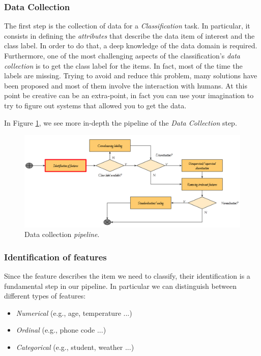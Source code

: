 \subsubsection{Data Collection}

The first step is the collection of data for a \emph{Classification} task. In particular, it consists in defining the \emph{attributes} that describe the data item of interest and the class label. In order to do that, a deep knowledge of the data domain is required. Furthermore, one of the most challenging aspects of the classification's \emph{data collection} is to get the class label for the items. In fact, most of the time the labels are missing. Trying to avoid and reduce this problem, many solutions have been proposed and most of them involve the interaction with humans. At this point be creative can be an extra-point, in fact you can use your imagination to try to figure out systems that allowed you to get the data.

In Figure \ref{pic:data_collection_pipeline}, we see more in-depth the pipeline of the \emph{Data Collection} step. 

\begin{figure}[H]%
 \centering
 \includegraphics[width=13cm]{./img/08/data_collection_pipeline}
 \caption{\label{pic:data_collection_pipeline} Data collection \emph{pipeline}.}
\end{figure}

\subsubsection*{Identification of features}

Since the feature describes the item we need to classify, their identification is a fundamental step in our pipeline. In particular we can distinguish between different types of features:
\begin{itemize}
\item \emph{Numerical} (e.g., age, temperature ...)
\item \emph{Ordinal} (e.g., phone code ...)
\item \emph{Categorical} (e.g., student, weather ...)
\end{itemize}

